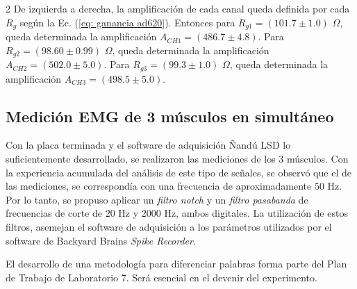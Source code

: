 \documentclass[11pt,letterpaper]{article}
\begin{document}
\begin{multicols*}{2}
De izquierda a derecha, la amplificación de cada canal queda definida por cada $R_g$ según la Ec. (\ref{eq: ganancia ad620}). Entonces para $R_{g1} = (101.7 \pm 1.0)$ $\Omega$, queda determinada la amplificación $A_{CH1} = (486.7 \pm 4.8)$. Para $R_{g2} = (98.60 \pm 0.99)$ $\Omega$, queda determinada la amplificación $A_{CH2} = (502.0 \pm 5.0)$. Para $R_{g3} = (99.3 \pm 1.0)$ $\Omega$, queda determinada la amplificación $A_{CH3} = (498.5 \pm 5.0)$.

\vspace{-6mm}
\subsection{Medición EMG de 3 músculos en simultáneo}
\vspace{-3mm}
Con la placa terminada y el software de adquisición Ñandú LSD lo suficientemente desarrollado, se realizaron las mediciones de los 3 músculos. Con la experiencia acumulada del análisis de este tipo de señales, se observó que el  de las mediciones, se correspondía con una frecuencia de aproximadamente $50$ Hz. Por lo tanto, se propuso aplicar un \textit{filtro notch} y un \textit{filtro pasabanda} de frecuencias de corte de $20$ Hz y $2000$ Hz, ambos digitales. La utilización de estos filtros, asemejan el software de adquisición a los parámetros utilizados por el software de Backyard Brains \textit{Spike Recorder}.

El desarrollo de una metodología para diferenciar palabras forma parte del Plan de Trabajo de Laboratorio 7. Será esencial en el devenir del experimento.


    
    

\end{multicols*}
\end{document}
